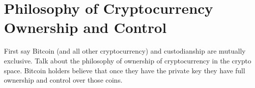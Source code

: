 %



\section{Philosophy of Cryptocurrency Ownership and Control}





First say Bitcoin (and all other cryptocurrency) and custodianship are mutually exclusive. Talk about the philosophy of ownership of cryptocurrency in the crypto space.  Bitcoin holders believe that once they have the private key they have full ownership and control over those coins. 

